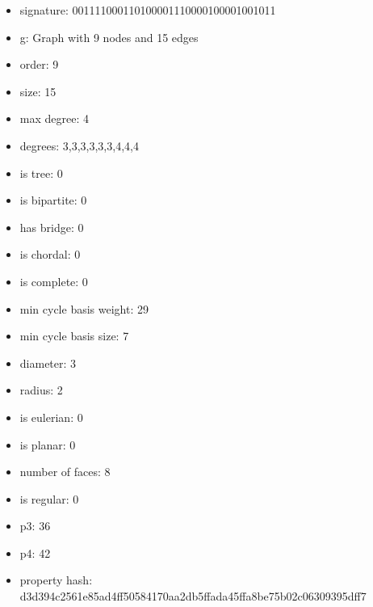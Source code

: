 \begin{figure}
\end{figure}
\begin{itemize}
\item signature: 001111000110100001110000100001001011
\item g: Graph with 9 nodes and 15 edges
\item order: 9
\item size: 15
\item max degree: 4
\item degrees: 3,3,3,3,3,3,4,4,4
\item is tree: 0
\item is bipartite: 0
\item has bridge: 0
\item is chordal: 0
\item is complete: 0
\item min cycle basis weight: 29
\item min cycle basis size: 7
\item diameter: 3
\item radius: 2
\item is eulerian: 0
\item is planar: 0
\item number of faces: 8
\item is regular: 0
\item p3: 36
\item p4: 42
\item property hash: d3d394c2561e85ad4ff50584170aa2db5ffada45ffa8be75b02c06309395dff7
\end{itemize}
\newpage
